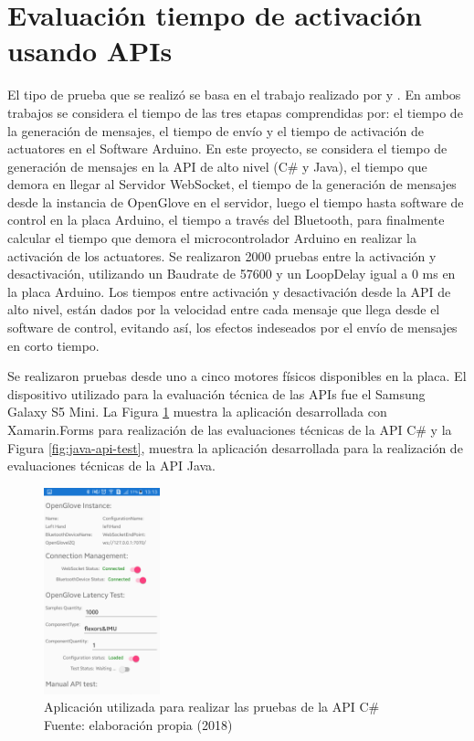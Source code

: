 \section{Evaluación tiempo de activación usando APIs}
El tipo de prueba que se realizó se basa en el trabajo realizado por \cite{tesis-monsalve-rodrigo} y \cite{tesis-meneses-sebastian}. En ambos trabajos se considera el tiempo de las tres etapas comprendidas por: el tiempo de la generación de mensajes, el tiempo de envío y el tiempo de activación de actuatores en el Software Arduino. En este proyecto, se considera el tiempo de generación de mensajes en la API de alto nivel (C\# y Java), el tiempo que demora en llegar al Servidor WebSocket, el tiempo de la generación de mensajes desde la instancia de OpenGlove en el servidor, luego el tiempo hasta software de control en la placa Arduino, el tiempo a través del Bluetooth, para finalmente calcular el tiempo que demora el microcontrolador Arduino en realizar la activación de los actuatores. Se realizaron 2000 pruebas entre la activación y desactivación, utilizando un Baudrate de 57600 y un LoopDelay igual a 0 ms en la placa Arduino. 
Los tiempos entre activación y desactivación desde la API de alto nivel, están dados por la velocidad entre cada mensaje que llega desde el software de control, evitando así, los efectos indeseados por el envío de mensajes en corto tiempo.

Se realizaron pruebas desde uno a cinco motores físicos disponibles en la placa. El dispositivo utilizado para la evaluación técnica de las APIs fue el Samsung Galaxy S5 Mini. La Figura \ref{fig:csharp-api-test} muestra la aplicación desarrollada con Xamarin.Forms para realización de las evaluaciones técnicas de la API C\#  y la Figura \ref{fig:java-api-test}, muestra la aplicación desarrollada para la realización de evaluaciones técnicas de la API Java.

\begin{figure}
 \begin{center}
   	\includegraphics[width=0.3\textwidth]{images/chapter05/C-Sharp-APITest.png}
   \centering
   \captionsetup{justification=centering}
    \caption[Aplicación utilizada para realizar las pruebas de la API C\# ]{Aplicación utilizada para realizar las pruebas de la API C\# \\Fuente: elaboración propia (2018)} 
    \label{fig:csharp-api-test}
  \end{center}
\end{figure}

